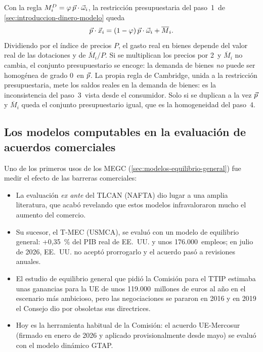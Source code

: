 \documentclass[11pt]{article}
\begin{document}
Con la regla $M^D_i=\varphi\,\vec{p}\cdot\vec{\omega}_i$, la restricción presupuestaria del paso~1~de \ref{sec:introduccion-dinero-modelo} queda
\begin{equation*}
\vec{p}\cdot\vec{x}_i=(1-\varphi)\,\vec{p}\cdot\vec{\omega}_i+\overline{M}_i .
\end{equation*}
Dividiendo por el índice de precios $P$, el gasto real en bienes depende del valor real de las dotaciones y de $\overline{M}_i/P$. Si se multiplican los precios por 2~y $\overline{M}_i$ no cambia, el conjunto presupuestario se encoge: la demanda de bienes \emph{no} puede ser homogénea de grado 0~en $\vec{p}$. La propia regla de Cambridge, unida a la restricción presupuestaria, mete los saldos reales en la demanda de bienes: es la inconsistencia del paso~3~vista desde el consumidor. Solo si se duplican a la vez $\vec{p}$ y $\overline{M}_i$ queda el conjunto presupuestario igual, que es la homogeneidad del paso~4\nocite{Patinkin1965Money}.

\subsection{Los modelos computables en la evaluación de acuerdos comerciales}\label{anexo:megc-comercio}

Uno de los primeros usos de los MEGC (\ref{sec:modelos-equilibrio-general}) fue medir el efecto de las barreras comerciales:
\begin{itemize}
\item La evaluación \emph{ex ante} del TLCAN (NAFTA) dio lugar a una amplia literatura, que acabó revelando que estos modelos infravaloraron mucho el aumento del comercio\nocite{Kehoe2005Evaluation}.
\item Su sucesor, el T-MEC (USMCA), se evaluó con un modelo de equilibrio general: +0,35~\% del PIB real de EE.~UU. y unos 176.000~empleos\nocite{USITC2019USMCA}; en julio de 2026, EE.~UU. no aceptó prorrogarlo y el acuerdo pasó a revisiones anuales\nocite{USTR2026USMCAReview}.
\item El estudio de equilibrio general que pidió la Comisión para el TTIP estimaba unas ganancias para la UE de unos 119.000~millones de euros al año en el escenario más ambicioso\nocite{FrancoisEtAl2013TTIP}, pero las negociaciones se pararon en 2016 y en 2019 el Consejo dio por obsoletas sus directrices\nocite{Consejo2019DecisionEEUU}.
\item Hoy es la herramienta habitual de la Comisión: el acuerdo UE-Mercosur (firmado en enero de 2026 y aplicado provisionalmente desde mayo) se evaluó con el modelo dinámico GTAP\nocite{CE2025MercosurAnalisis,AguiarEtAl2025GTAP12}.
\end{itemize}
\end{document}
